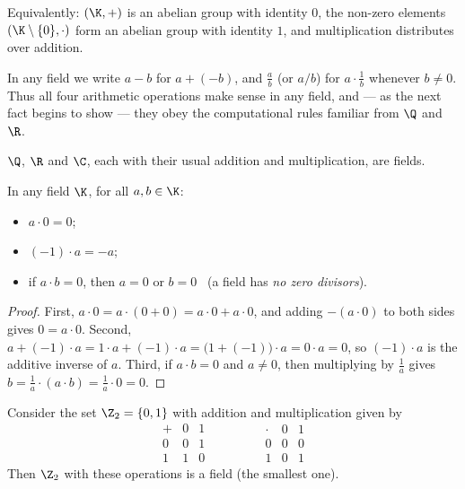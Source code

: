 \begin{remark}
Equivalently: $(\K,+)$ is an abelian group with identity $0$, the non-zero elements
$(\K\setminus\{0\},\cdot)$ form an abelian group with identity $1$, and multiplication distributes over
addition.
\end{remark}

\begin{remark}
In any field we write $a-b$ for $a+(-b)$, and $\tfrac{a}{b}$ (or $a/b$) for $a\cdot \tfrac1b$ whenever
$b\neq 0$. Thus all four arithmetic operations make sense in any field, and — as the next fact begins to
show — they obey the computational rules familiar from $\Q$ and $\R$.
\end{remark}

\begin{example}
$\Q$, $\R$ and $\C$, each with their usual addition and multiplication, are fields.
\end{example}

\begin{fact}
In any field $\K$, for all $a,b\in\K$:
\begin{itemize}
\item $a\cdot 0 = 0$;
\item $(-1)\cdot a = -a$;
\item if $a\cdot b = 0$, then $a=0$ or $b=0$ \ (a field has \emph{no zero divisors}).
\end{itemize}
\end{fact}

\begin{proof}
First, $a\cdot 0 = a\cdot(0+0) = a\cdot 0 + a\cdot 0$, and adding $-(a\cdot 0)$ to both sides gives
$0 = a\cdot 0$. Second, $a + (-1)\cdot a = 1\cdot a + (-1)\cdot a = \big(1+(-1)\big)\cdot a = 0\cdot a = 0$,
so $(-1)\cdot a$ is the additive inverse of $a$. Third, if $a\cdot b = 0$ and $a\neq 0$, then multiplying by
$\tfrac1a$ gives $b = \tfrac1a\cdot(a\cdot b) = \tfrac1a\cdot 0 = 0$.
\end{proof}

\begin{example}
Consider the set $\Z_2=\{0,1\}$ with addition and multiplication given by
\[
\begin{array}{c|cc} + & 0 & 1 \\ \hline 0 & 0 & 1 \\ 1 & 1 & 0 \end{array}
\qquad\qquad
\begin{array}{c|cc} \cdot & 0 & 1 \\ \hline 0 & 0 & 0 \\ 1 & 0 & 1 \end{array}
\]
Then $\Z_2$ with these operations is a field (the smallest one).
\end{example}

